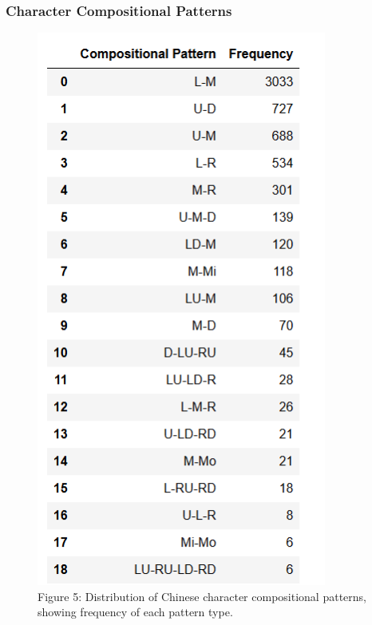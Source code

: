 \documentclass[
  11pt,
  letterpaper,
]{article}
\begin{document}
\subsubsection{Character Compositional
Patterns}\label{character-compositional-patterns}

\begin{figure}
\centering
\includegraphics[width=0.85\textwidth]{./images/app_compositional_pattern.png}
\caption{Figure 5: Distribution of Chinese character compositional
patterns, showing frequency of each pattern type.}
\end{figure}
\end{document}
